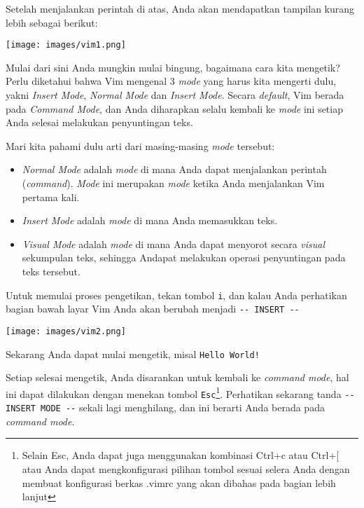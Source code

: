 \documentclass{article}
\begin{document}
Setelah menjalankan perintah di atas, Anda akan mendapatkan
tampilan kurang lebih sebagai berikut:

\vspace{12pt}

\texttt{[image: images/vim1.png]} 


\vspace{12pt}

Mulai dari sini Anda mungkin mulai bingung, bagaimana cara
kita mengetik? Perlu diketahui bahwa Vim mengenal 3
\emph{mode} yang harus kita mengerti dulu, yakni
\emph{Insert Mode}, \emph{Normal Mode} dan 
\emph{Insert Mode}. Secara \emph{default}, Vim berada pada
\emph{Command Mode}, dan Anda diharapkan selalu kembali ke
\emph{mode} ini setiap Anda selesai melakukan penyuntingan
teks. 

Mari kita pahami dulu arti dari masing-masing \emph{mode}
tersebut:

\begin{itemize}
    \item \emph{Normal Mode} adalah \emph{mode} di mana Anda
        dapat menjalankan perintah (\emph{command}). 
        \emph{Mode} ini merupakan \emph{mode} ketika Anda
        menjalankan Vim pertama kali.
    \item \emph{Insert Mode} adalah \emph{mode} di mana Anda
        memasukkan teks.
    \item \emph{Visual Mode} adalah \emph{mode} di mana Anda
        dapat menyorot secara \emph{visual} sekumpulan teks,
        sehingga Andapat melakukan operasi penyuntingan pada
        teks tersebut.
\end{itemize}

Untuk memulai proses pengetikan, tekan tombol \verb=i=, dan
kalau Anda perhatikan bagian bawah layar Vim Anda akan
berubah menjadi \verb=-- INSERT --=

\vspace{12pt}

\texttt{[image: images/vim2.png]}

\vspace{12pt}

Sekarang Anda dapat mulai mengetik, misal \verb=Hello World!=

Setiap selesai mengetik, Anda disarankan untuk kembali ke
\emph{command mode}, hal ini dapat dilakukan dengan menekan
tombol \verb=Esc=\footnote{Selain Esc, Anda dapat juga
    menggunakan kombinasi Ctrl+c atau Ctrl+[ atau Anda dapat
    mengkonfigurasi pilihan tombol sesuai selera Anda dengan
membuat konfigurasi berkas .vimrc yang akan dibahas pada
bagian lebih lanjut}. Perhatikan sekarang tanda 
\verb=-- INSERT MODE --= sekali lagi menghilang, dan ini
berarti Anda berada pada \emph{command mode}. 
\end{document}
